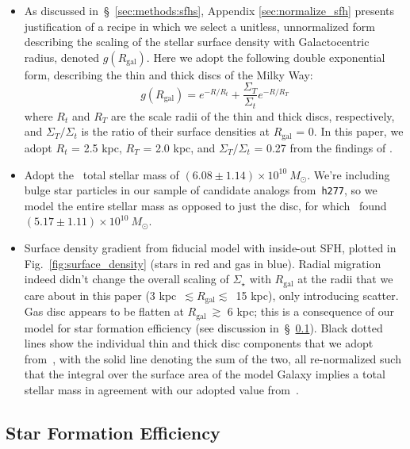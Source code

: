 \documentclass[fleqn, usenatbib]{mnras}
\begin{document}
\begin{itemize} 
	\item As discussed in~\S~\ref{sec:methods:sfhs}, Appendix 
	\ref{sec:normalize_sfh} presents justification of a recipe in which we 
	select a unitless, unnormalized form describing the scaling of the 
	stellar surface density with Galactocentric radius, denoted 
	$g(R_\text{gal})$. Here we adopt the following double exponential form, 
	describing the thin and thick discs of the Milky Way: 
	\begin{equation} 
	g(R_\text{gal}) = e^{-R/R_t} + \frac{\Sigma_T}{\Sigma_t}e^{-R/R_T} 
	\end{equation} 
	where $R_t$ and $R_T$ are the scale radii of the thin and thick discs, 
	respectively, and $\Sigma_T/\Sigma_t$ is the ratio of their surface 
	densities at $R_\text{gal}$ = 0. In this paper, we adopt $R_t$ = 2.5 kpc, 
	$R_T$ = 2.0 kpc, and $\Sigma_T/\Sigma_t$ = 0.27 from the findings of 
	\citet{Bland-Hawthorn2016}. 

	\item Adopt the~\citet{Licquia2015} total stellar mass of 
	$(6.08\pm1.14)\times10^{10}~M_\odot$. We're including bulge star particles 
	in our sample of candidate analogs from~\texttt{h277}, so we model the 
	entire stellar mass as opposed to just the disc, for 
	which~\citet{Licquia2015} found $(5.17\pm1.11)\times10^{10}~M_\odot$. 

	\item Surface density gradient from fiducial model with inside-out SFH, 
	plotted in Fig.~\ref{fig:surface_density} (stars in red and gas in blue). 
	Radial migration indeed didn't change the overall scaling of 
	$\Sigma_\star$ with $R_\text{gal}$ at the radii that we care about in 
	this paper (3 kpc~$\lesssim R_\text{gal} \lesssim$~15 kpc), only 
	introducing scatter. Gas disc appears to be flatten at 
	$R_\text{gal}~\gtrsim$ 6 kpc; this is a consequence of our model for star 
	formation efficiency (see discussion in~\S~\ref{sec:methods:sfe}). Black 
	dotted lines show the individual thin and thick disc components that we 
	adopt from~\citet{Bland-Hawthorn2016}, with the solid line denoting the 
	sum of the two, all re-normalized such that the integral over the surface 
	area of the model Galaxy implies a total stellar mass in agreement with 
	our adopted value from~\citet{Licquia2015}. 
\end{itemize} 

\subsection{Star Formation Efficiency} 
\label{sec:methods:sfe} 
\end{document}
